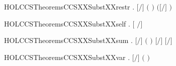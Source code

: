 \newcommand{\HOLCCSTheoremsCCSXXSubstXXrelab}{\UseVerbatim{HOLCCSTheoremsCCSXXSubstXXrelab}}
\begin{SaveVerbatim}{HOLCCSTheoremsCCSXXSubstXXrestr}
\HOLTokenTurnstile{} \HOLSymConst{\HOLTokenForall{}}   . \ensuremath{[}\ensuremath{/}\ensuremath{]} \ensuremath{(}  \ensuremath{)} \HOLSymConst{\ensuremath{=}}   \ensuremath{(}\ensuremath{[}\ensuremath{/}\ensuremath{]} \ensuremath{)}
\end{SaveVerbatim}
\newcommand{\HOLCCSTheoremsCCSXXSubstXXrestr}{\UseVerbatim{HOLCCSTheoremsCCSXXSubstXXrestr}}
\begin{SaveVerbatim}{HOLCCSTheoremsCCSXXSubstXXself}
\HOLTokenTurnstile{} \HOLSymConst{\HOLTokenForall{}} . \ensuremath{[} \ensuremath{/}\ensuremath{]}  \HOLSymConst{\ensuremath{=}} 
\end{SaveVerbatim}
\newcommand{\HOLCCSTheoremsCCSXXSubstXXself}{\UseVerbatim{HOLCCSTheoremsCCSXXSubstXXself}}
\begin{SaveVerbatim}{HOLCCSTheoremsCCSXXSubstXXsum}
\HOLTokenTurnstile{} \HOLSymConst{\HOLTokenForall{}}   . \ensuremath{[}\ensuremath{/}\ensuremath{]} \ensuremath{(} \HOLSymConst{\ensuremath{+}} \ensuremath{)} \HOLSymConst{\ensuremath{=}} \ensuremath{[}\ensuremath{/}\ensuremath{]}  \HOLSymConst{\ensuremath{+}} \ensuremath{[}\ensuremath{/}\ensuremath{]} 
\end{SaveVerbatim}
\newcommand{\HOLCCSTheoremsCCSXXSubstXXsum}{\UseVerbatim{HOLCCSTheoremsCCSXXSubstXXsum}}
\begin{SaveVerbatim}{HOLCCSTheoremsCCSXXSubstXXvar}
\HOLTokenTurnstile{} \HOLSymConst{\HOLTokenForall{}}  . \ensuremath{[}\ensuremath{/}\ensuremath{]} \ensuremath{(} \ensuremath{)} \HOLSymConst{\ensuremath{=}}   \HOLSymConst{\ensuremath{=}}      
\end{SaveVerbatim}
